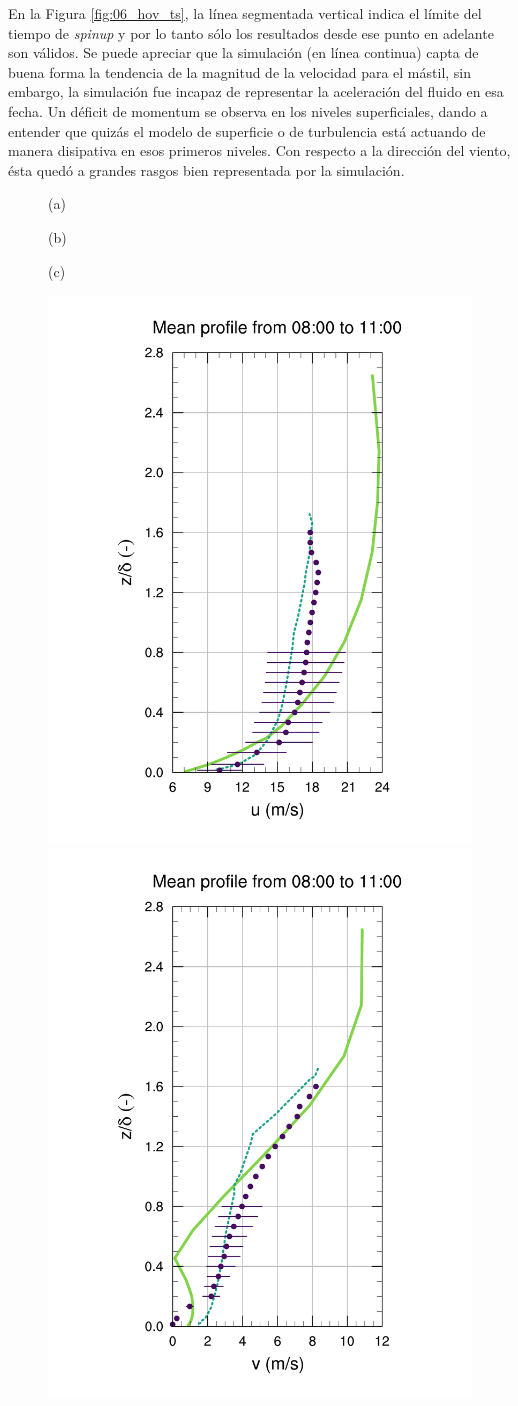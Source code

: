 En la Figura \ref{fig:06_hov_ts}, la línea segmentada vertical indica el límite del tiempo de \emph{spinup} y por lo tanto sólo los resultados desde ese punto en adelante son válidos. Se puede apreciar que la simulación (en línea continua) capta de buena forma la tendencia de la magnitud de la velocidad para el mástil, sin embargo, la simulación fue incapaz de representar la aceleración del fluido en esa fecha. Un déficit de momentum se observa en los niveles superficiales, dando a entender que quizás el modelo de superficie o de turbulencia está actuando de manera disipativa en esos primeros niveles. Con respecto a la dirección del viento, ésta quedó a grandes rasgos bien representada por la simulación.

\begin{figure}[H]
	\begin{minipage}{0.33\linewidth}
		\centering \hspace{1.5cm}(a)
	\end{minipage}%
	\begin{minipage}{0.33\linewidth}
		\centering \hspace{1cm}(b)
	\end{minipage}%
	\begin{minipage}{0.33\linewidth}
		\centering \hspace{1cm}(c)
	\end{minipage}%
	\vspace{-3mm}
	\begin{center}
	\includegraphics[height=0.62\linewidth,page=37,trim={35mm 10mm 41mm 25mm},clip]{Imagenes/06/hov/9u}%
	\includegraphics[height=0.62\linewidth,page=37,trim={48mm 10mm 41mm 25mm},clip]{Imagenes/06/hov/9v}%

\end{center}
\end{figure}
